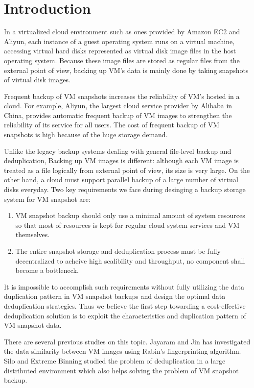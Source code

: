 \section{Introduction}
In a virtualized cloud environment such as ones provided by Amazon EC2 and Aliyun,
each instance of a guest operating system runs on a virtual machine, accessing
virtual hard disks represented as virtual disk image files in the host operating system.
Because these image files are stored as regular files from the external point of view,
backing up VM's data is mainly done by taking snapshots of virtual disk images.

Frequent  backup of VM snapshots increases  the reliability of VM's hosted in a cloud.
For example, Aliyun, the largest cloud service provider by Alibaba in China, 
provides automatic frequent backup of VM images to strengthen the reliability of its service for all users.
The cost of frequent backup of VM snapshots is  high because of the huge storage demand.

Unlike the legacy backup systems\cite{jumbo07} dealing with general file-level backup and deduplication, 
Backing up VM images is different: although each VM image is treated as a file logically from
external point of view, its size is very large.
On the other hand, a cloud must support parallel backup of a large number of virtual disks everyday. 
Two key requirements we face during desinging a backup storage system for VM snapshot are: 
\begin{enumerate}
\item VM snapshot backup should only use a minimal amount of system
resources so that most of resources is kept for regular cloud system services and VM themselves.
\item The entire snapshot storage and deduplication process must be fully decentralized to acheive
high scalibility and throughput, 
no component shall become a bottleneck.
\end{enumerate}

It is impossible to accomplish such requirements without fully utilizing the data duplication pattern
in VM snapshot backups
and design the optimal data deduplication strategies.
Thus we believe the first step towarding a cost-effective deduplication solution
 is to exploit the characteristics and duplication pattern of VM snapshot data. 

There are several previous studies on this topic. Jayaram\cite{Jayaram2011} and
Jin\cite{Jin2009} has investigated the data similarity between VM images using 
Rabin's fingerprinting\cite{identify00} algorithm. 
Silo\cite{xia2011} and Extreme Binning\cite{extreme_binning09} studied the problem
of deduplication in a large distributed environment which also helps solving the
problem of VM snapshot backup.

